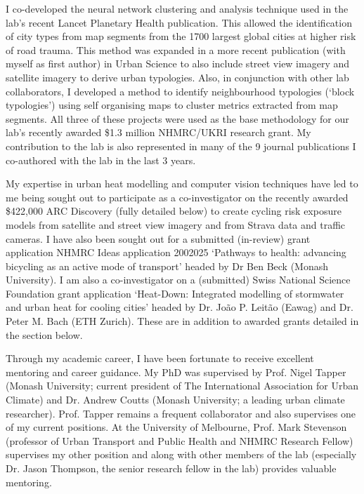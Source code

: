 I co-developed the neural network clustering and analysis technique used in the lab's recent Lancet Planetary Health publication. This allowed the identification of city types from map segments from the 1700 largest global cities at higher risk of road trauma. This method was expanded in a more recent publication (with myself as first author) in Urban Science to also include street view imagery and satellite imagery to derive urban typologies. Also, in conjunction with other lab collaborators, I developed a method to identify neighbourhood typologies (`block typologies') using self organising maps to cluster metrics extracted from map segments. All three of these projects were used as the base methodology for our lab's recently awarded \$1.3 million NHMRC/UKRI research grant. My contribution to the lab is also represented in many of the 9 journal publications I co-authored with the lab in the last 3 years.

My expertise in urban heat modelling and computer vision techniques have led to me being sought out to participate as a co-investigator on the recently awarded \$422,000 ARC Discovery (fully detailed below) to create cycling risk exposure models from satellite and street view imagery and from Strava data and traffic cameras. I have also been sought out for a submitted (in-review) grant application  NHMRC Ideas application 2002025 `Pathways to health: advancing bicycling as an active mode of transport' headed by Dr Ben Beck (Monash University). I am also a co-investigator on a (submitted) Swiss National Science Foundation grant application `Heat-Down: Integrated modelling of stormwater and urban heat for cooling cities' headed by Dr. Jo\~{a}o P. Leit\~{a}o (Eawag) and Dr. Peter M. Bach (ETH Zurich). These are in addition to awarded grants detailed in the section below.



Through my academic career, I have been fortunate to receive excellent mentoring and career guidance. My PhD was supervised by Prof. Nigel Tapper (Monash University; current president of The International Association for Urban Climate) and Dr. Andrew Coutts (Monash University; a leading urban climate researcher). Prof. Tapper remains a frequent collaborator and also supervises one of my current positions. At the University of Melbourne, Prof. Mark Stevenson (professor of Urban Transport and Public Health and NHMRC Research Fellow) supervises my other position and along with other members of the lab (especially Dr. Jason Thompson, the senior research fellow in the lab) provides valuable mentoring.

